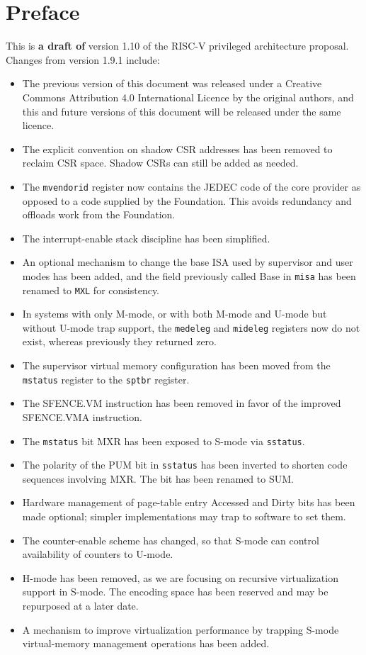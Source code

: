 \chapter{Preface}

This is {\bf a draft of} version 1.10 of the RISC-V privileged
architecture proposal.  Changes from version 1.9.1 include:

\begin{itemize}
  \parskip 0pt
  \itemsep 1pt
\item The previous version of this document was released under a
  Creative Commons Attribution 4.0 International Licence by the
  original authors, and this and future versions of this document will
  be released under the same licence.
\item The explicit convention on shadow CSR addresses has been removed
  to reclaim CSR space.  Shadow CSRs can still be added as needed.
\item The {\tt mvendorid} register now contains the JEDEC code of the
  core provider as opposed to a code supplied by the Foundation.  This
  avoids redundancy and offloads work from the Foundation.
\item The interrupt-enable stack discipline has been simplified.
\item An optional mechanism to change the base ISA used by supervisor
  and user modes has been added, and the field previously called Base
  in {\tt misa} has been renamed to {\tt MXL} for consistency.
\item In systems with only M-mode, or with both M-mode and U-mode but
  without U-mode trap support, the {\tt medeleg} and {\tt mideleg}
    registers now do not exist, whereas previously they returned zero.
\item The supervisor virtual memory configuration has been moved from the
  {\tt mstatus} register to the {\tt sptbr} register.
\item The SFENCE.VM instruction has been removed in favor of the improved
  SFENCE.VMA instruction.
\item The {\tt mstatus} bit MXR has been exposed to S-mode via {\tt sstatus}.
\item The polarity of the PUM bit in {\tt sstatus} has been inverted to
  shorten code sequences involving MXR.  The bit has been renamed to SUM.
\item Hardware management of page-table entry Accessed and Dirty bits has
  been made optional; simpler implementations may trap to software to
  set them.
\item The counter-enable scheme has changed, so that S-mode can
  control availability of counters to U-mode.
\item H-mode has been removed, as we are focusing on recursive
  virtualization support in S-mode.  The encoding space has been
  reserved and may be repurposed at a later date.
\item A mechanism to improve virtualization performance by
  trapping S-mode virtual-memory management operations has been added.
\end{itemize}

